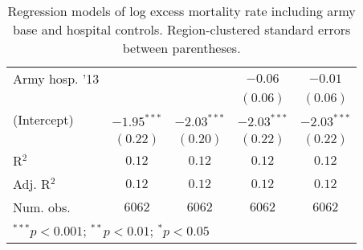\begin{table}
\begin{center}
\begin{tabular}{l c c c c}
Army hosp. '13       &               &               & $-0.06$       & $-0.01$       \\
                     &               &               & $(0.06)$      & $(0.06)$      \\
(Intercept)          & $-1.95^{***}$ & $-2.03^{***}$ & $-2.03^{***}$ & $-2.03^{***}$ \\
                     & $(0.22)$      & $(0.20)$      & $(0.22)$      & $(0.22)$      \\
\hline
R$^2$                & $0.12$        & $0.12$        & $0.12$        & $0.12$        \\
Adj. R$^2$           & $0.12$        & $0.12$        & $0.12$        & $0.12$        \\
Num. obs.            & $6062$        & $6062$        & $6062$        & $6062$        \\
\hline
\multicolumn{5}{l}{\scriptsize{$^{***}p<0.001$; $^{**}p<0.01$; $^{*}p<0.05$}}
\end{tabular}
\caption{Regression models of log excess mortality rate including army base and hospital controls. Region-clustered standard errors between parentheses.}
\label{tab:popdensmodels}
\end{center}
\end{table}
